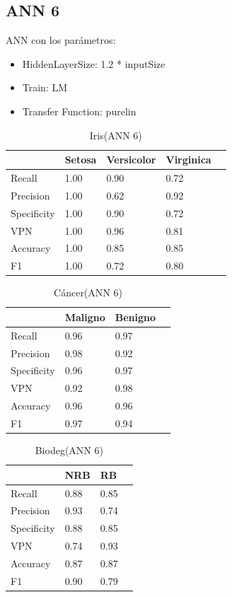 \documentclass[a4paper,openwrite,12pt]{article}
\begin{document}
\subsection{ANN 6}
ANN con los parámetros:
\begin{itemize}
    \item HiddenLayerSize: 1.2 * inputSize
    \item Train: LM
    \item Transfer Function: purelin
\end{itemize}

\begin{table}[H]
\centering
\begin{tabular}{@{}lllll@{}}
\toprule
            & Setosa & Versicolor & Virginica &  \\ \midrule
Recall      & 1.00   & 0.90       & 0.72      &  \\
Precision   & 1.00   & 0.62       & 0.92      &  \\
Specificity & 1.00   & 0.90       & 0.72      &  \\
VPN         & 1.00   & 0.96       & 0.81      &  \\
Accuracy    & 1.00   & 0.85       & 0.85      &  \\
F1          & 1.00   & 0.72       & 0.80      &  \\ \bottomrule
\end{tabular}
\caption{Iris(ANN 6)}
\end{table}


\begin{table}[H]
\centering
\begin{tabular}{@{}llll@{}}
\toprule
            & Maligno & Benigno &  \\ \midrule
Recall      & 0.96    & 0.97    &  \\
Precision   & 0.98    & 0.92    &  \\
Specificity & 0.96    & 0.97    &  \\
VPN         & 0.92    & 0.98    &  \\
Accuracy    & 0.96    & 0.96    &  \\
F1          & 0.97    & 0.94    &  \\ \bottomrule
\end{tabular}
\caption{Cáncer(ANN 6)}
\end{table}

\begin{table}[H]
\centering
\begin{tabular}{@{}llll@{}}
\toprule
            & NRB &   RB &  \\ \midrule
Recall      & 0.88    & 0.85    &  \\
Precision   & 0.93    & 0.74    &  \\
Specificity & 0.88    & 0.85    &  \\
VPN         & 0.74    & 0.93    &  \\
Accuracy    & 0.87    & 0.87    &  \\
F1          & 0.90    & 0.79    &  \\ \bottomrule
\end{tabular}
\caption{Biodeg(ANN 6)}
\end{table}
\end{document}
